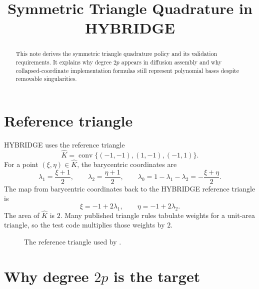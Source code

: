 \documentclass[11pt]{article}
\title{Symmetric Triangle Quadrature in HYBRIDGE}
\author{}
\date{}
\newcommand{\code}[1]{\texttt{\detokenize{#1}}}
\newcommand{\Khat}{\widehat K}
\newcommand{\lam}{\lambda}
\begin{document}
\maketitle

\begin{abstract}
This note derives the symmetric triangle quadrature policy and its validation
requirements. It explains why degree \(2p\) appears in diffusion assembly and
why collapsed-coordinate implementation formulas still represent polynomial
bases despite removable singularities.
\end{abstract}

\tableofcontents

\section{Reference triangle}

HYBRIDGE uses the reference triangle
\[
  \Khat = \operatorname{conv}\{(-1,-1), (1,-1), (-1,1)\}.
\]
For a point \((\xi,\eta)\in\Khat\), the barycentric coordinates are
\[
  \lam_1 = \frac{\xi+1}{2},\qquad
  \lam_2 = \frac{\eta+1}{2},\qquad
  \lam_0 = 1-\lam_1-\lam_2 = -\frac{\xi+\eta}{2}.
\]
The map from barycentric coordinates back to the HYBRIDGE reference triangle is
\[
  \xi=-1+2\lam_1,\qquad \eta=-1+2\lam_2.
\]
The area of \(\Khat\) is \(2\).  Many published triangle rules tabulate
weights for a unit-area triangle, so the test code multiplies those weights by
\(2\).

\begin{figure}[htbp]
\centering
{}
\caption{The reference triangle used by \code{hybridge/core/quadrature.py}.}
\label{fig:reference-triangle}
\end{figure}

\section{\texorpdfstring{Why degree \(2p\) is the target}{Why degree 2p is the target}}
\end{document}
